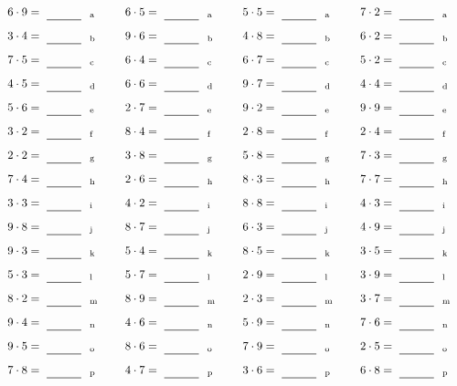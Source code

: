 \documentclass
[
  draft    = true,
  fontsize = 11pt,
  parskip  = half-
]
{scrartcl}
\begin{document}
\par\vfill\par
\begin{align*}
    \pline{6\cdot9}&=\rline{a}
  & \pline{6\cdot5}&=\rline{a}
  & \pline{5\cdot5}&=\rline{a}
  & \pline{7\cdot2}&=\rline{a} \\[1ex]
    \pline{3\cdot4}&=\rline{b}
  & \pline{9\cdot6}&=\rline{b}
  & \pline{4\cdot8}&=\rline{b}
  & \pline{6\cdot2}&=\rline{b} \\[1ex]
    \pline{7\cdot5}&=\rline{c}
  & \pline{6\cdot4}&=\rline{c}
  & \pline{6\cdot7}&=\rline{c}
  & \pline{5\cdot2}&=\rline{c} \\[1ex]
    \pline{4\cdot5}&=\rline{d}
  & \pline{6\cdot6}&=\rline{d}
  & \pline{9\cdot7}&=\rline{d}
  & \pline{4\cdot4}&=\rline{d} \\[1ex]
    \pline{5\cdot6}&=\rline{e}
  & \pline{2\cdot7}&=\rline{e}
  & \pline{9\cdot2}&=\rline{e}
  & \pline{9\cdot9}&=\rline{e} \\[1ex]
    \pline{3\cdot2}&=\rline{f}
  & \pline{8\cdot4}&=\rline{f}
  & \pline{2\cdot8}&=\rline{f}
  & \pline{2\cdot4}&=\rline{f} \\[1ex]
    \pline{2\cdot2}&=\rline{g}
  & \pline{3\cdot8}&=\rline{g}
  & \pline{5\cdot8}&=\rline{g}
  & \pline{7\cdot3}&=\rline{g} \\[1ex]
    \pline{7\cdot4}&=\rline{h}
  & \pline{2\cdot6}&=\rline{h}
  & \pline{8\cdot3}&=\rline{h}
  & \pline{7\cdot7}&=\rline{h} \\[1ex]
    \pline{3\cdot3}&=\rline{i}
  & \pline{4\cdot2}&=\rline{i}
  & \pline{8\cdot8}&=\rline{i}
  & \pline{4\cdot3}&=\rline{i} \\[1ex]
    \pline{9\cdot8}&=\rline{j}
  & \pline{8\cdot7}&=\rline{j}
  & \pline{6\cdot3}&=\rline{j}
  & \pline{4\cdot9}&=\rline{j} \\[1ex]
    \pline{9\cdot3}&=\rline{k}
  & \pline{5\cdot4}&=\rline{k}
  & \pline{8\cdot5}&=\rline{k}
  & \pline{3\cdot5}&=\rline{k} \\[1ex]
    \pline{5\cdot3}&=\rline{l}
  & \pline{5\cdot7}&=\rline{l}
  & \pline{2\cdot9}&=\rline{l}
  & \pline{3\cdot9}&=\rline{l} \\[1ex]
    \pline{8\cdot2}&=\rline{m}
  & \pline{8\cdot9}&=\rline{m}
  & \pline{2\cdot3}&=\rline{m}
  & \pline{3\cdot7}&=\rline{m} \\[1ex]
    \pline{9\cdot4}&=\rline{n}
  & \pline{4\cdot6}&=\rline{n}
  & \pline{5\cdot9}&=\rline{n}
  & \pline{7\cdot6}&=\rline{n} \\[1ex]
    \pline{9\cdot5}&=\rline{o}
  & \pline{8\cdot6}&=\rline{o}
  & \pline{7\cdot9}&=\rline{o}
  & \pline{2\cdot5}&=\rline{o} \\[1ex]
    \pline{7\cdot8}&=\rline{p}
  & \pline{4\cdot7}&=\rline{p}
  & \pline{3\cdot6}&=\rline{p}
  & \pline{6\cdot8}&=\rline{p}
\end{align*}
\end{document}
